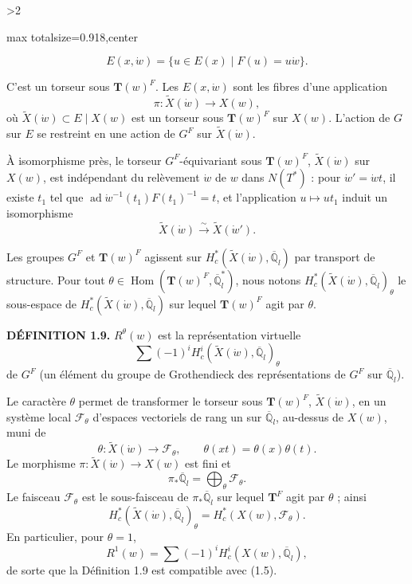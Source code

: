 \documentclass[9pt,twoside]{extarticle}
\newcommand{\EditionPage}[3]{%
  \ifnum#1>2\clearpage\fi
  \pdfbookmark[1]{Printed page #2}{fr-folio-#2}%
  \hypertarget{fr-physical-#1}{}%
  \noindent\begin{adjustbox}{max totalsize={\textwidth}{0.918\textheight},center}
  \begin{minipage}[t]{\textwidth}
  \fontsize{9.4}{11.1}\selectfont\justifying
  #3
  \end{minipage}
  \end{adjustbox}%
}
\begin{document}
\EditionPage{10}{111}{%
\[
E(x,\dot w)=\{u\in E(x)\mid F(u)=u\dot w\}.
\]

C'est un torseur sous \(\mathbf T(w)^F\). Les \(E(x,\dot w)\) sont les fibres d'une application \[
\pi:\widetilde X(\dot w)\longrightarrow X(w),
\] où \(\widetilde X(\dot w)\subset E\mid X(w)\) est un torseur sous \(\mathbf T(w)^F\) sur \(X(w)\). L'action de \(G\) sur \(E\) se restreint en une action de \(G^F\) sur \(\widetilde X(\dot w)\).\par

À isomorphisme près, le torseur \(G^F\)-équivariant sous \(\mathbf T(w)^F\), \(\widetilde X(\dot w)\) sur \(X(w)\), est indépendant du relèvement \(\dot w\) de \(w\) dans \(N(T^*)\) : pour \(\dot w'=\dot wt\), il existe \(t_1\) tel que \(\operatorname{ad}\dot w^{-1}(t_1)F(t_1)^{-1}=t\), et l'application \(u\mapsto ut_1\) induit un isomorphisme \[
\widetilde X(\dot w)\xrightarrow{\sim}\widetilde X(\dot w').
\]\par

Les groupes \(G^F\) et \(\mathbf T(w)^F\) agissent sur \(H_c^*(\widetilde X(\dot w),\overline{\mathbb{Q}}_l)\) par transport de structure. Pour tout \(\theta\in\operatorname{Hom}(\mathbf T(w)^F,\overline{\mathbb{Q}}_l^*)\), nous notons \(H_c^*(\widetilde X(\dot w),\overline{\mathbb{Q}}_l)_\theta\) le sous-espace de \(H_c^*(\widetilde X(\dot w),\overline{\mathbb{Q}}_l)\) sur lequel \(\mathbf T(w)^F\) agit par \(\theta\).\par

\noindent\textbf{DÉFINITION 1.9.} \(R^\theta(w)\) est la représentation virtuelle \[
\sum(-1)^iH_c^i(\widetilde X(\dot w),\overline{\mathbb{Q}}_l)_\theta
\] de \(G^F\) (un élément du groupe de Grothendieck des représentations de \(G^F\) sur \(\overline{\mathbb{Q}}_l\)).\par

Le caractère \(\theta\) permet de transformer le torseur sous \(\mathbf T(w)^F\), \(\widetilde X(\dot w)\), en un système local \(\mathcal F_\theta\) d'espaces vectoriels de rang un sur \(\overline{\mathbb{Q}}_l\), au-dessus de \(X(w)\), muni de \[
\theta:\widetilde X(\dot w)\longrightarrow\mathcal F_\theta,\qquad \theta(xt)=\theta(x)\theta(t).
\] Le morphisme \(\pi:\widetilde X(\dot w)\to X(w)\) est fini et \[
\pi_*\overline{\mathbb{Q}}_l=\bigoplus_\theta\mathcal F_\theta.
\] Le faisceau \(\mathcal F_\theta\) est le sous-faisceau de \(\pi_*\overline{\mathbb{Q}}_l\) sur lequel \(\mathbf T^F\) agit par \(\theta\) ; ainsi \[
H_c^*(\widetilde X(\dot w),\overline{\mathbb{Q}}_l)_\theta=H_c^*(X(w),\mathcal F_\theta).
\] En particulier, pour \(\theta=1\), \[
R^1(w)=\sum(-1)^iH_c^i(X(w),\overline{\mathbb{Q}}_l),
\] de sorte que la Définition 1.9 est compatible avec (1.5).\par

}
\end{document}
